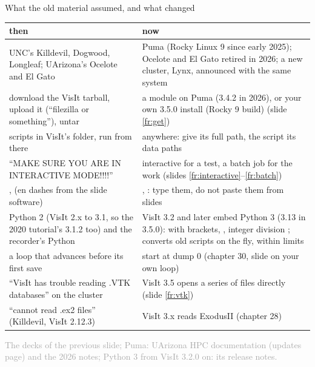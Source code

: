 \documentclass[aspectratio=169,11pt]{beamer}
\newcommand{\sourcecredit}[1]{\vfill\begin{flushright}\tiny\textcolor{DarkGray}{#1}\end{flushright}}
\begin{document}
\begin{frame}{What the old material assumed, and what changed}
\label{fr:old}
\scriptsize
\begin{tabular}{@{}L{0.37\textwidth}L{0.59\textwidth}@{}}
\toprule
then & now \\
\midrule
UNC's Killdevil, Dogwood, Longleaf; UArizona's Ocelote and El Gato & Puma (Rocky Linux 9 since early 2025); Ocelote and El Gato retired in 2026; a new cluster, Lynx, announced with the same system \\
download the VisIt tarball, upload it (``filezilla or something''), untar & a  module on Puma (3.4.2 in 2026), or your own 3.5.0 install (Rocky 9 build) (slide \ref{fr:get}) \\
scripts in VisIt's  folder, run from there & anywhere: give  its full path, the script its data paths \\
``MAKE SURE YOU ARE IN INTERACTIVE MODE!!!!'' & interactive for a test, a batch job for the work (slides \ref{fr:interactive}--\ref{fr:batch}) \\
,  (en dashes from the slide software) & , : type them, do not paste them from slides \\
Python 2 (VisIt 2.x to 3.1, so the 2020 tutorial's 3.1.2 too) and the recorder's Python & VisIt 3.2 and later embed Python 3 (3.13 in 3.5.0):  with brackets, , integer division \code{//};  converts old scripts on the fly, within limits \\
a loop that advances before its first save & start at dump 0 (chapter 30, slide on your own loop) \\
``VisIt has trouble reading .VTK databases'' on the cluster & VisIt 3.5 opens a series of  files directly (slide \ref{fr:vtk}) \\
``cannot read .ex2 files'' (Killdevil, VisIt 2.12.3) & VisIt 3.x reads ExodusII (chapter 28) \\
\bottomrule
\end{tabular}
\sourcecredit{The decks of the previous slide; Puma: UArizona HPC documentation (updates page) and the 2026 notes; Python 3 from VisIt 3.2.0 on: its release notes.}
\end{frame}
\end{document}
